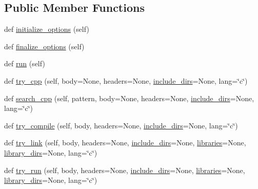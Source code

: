 \subsection*{Public Member Functions}
\begin{DoxyCompactItemize}
\item 
def \hyperlink{classsetuptools_1_1__distutils_1_1command_1_1config_1_1config_abb9677a5717da0170ef7b59fbf0de81c}{initialize\+\_\+options} (self)
\item 
def \hyperlink{classsetuptools_1_1__distutils_1_1command_1_1config_1_1config_a1b7c7fbb7934e5ac73bf41d03e1a105b}{finalize\+\_\+options} (self)
\item 
def \hyperlink{classsetuptools_1_1__distutils_1_1command_1_1config_1_1config_aa893e04cc412266537a91602b4874078}{run} (self)
\item 
def \hyperlink{classsetuptools_1_1__distutils_1_1command_1_1config_1_1config_ae4c3306eb838dd726030348758bddddb}{try\+\_\+cpp} (self, body=None, headers=None, \hyperlink{classsetuptools_1_1__distutils_1_1command_1_1config_1_1config_acb41ac5815aee2bd72a28028096a0564}{include\+\_\+dirs}=None, lang=\char`\"{}c\char`\"{})
\item 
def \hyperlink{classsetuptools_1_1__distutils_1_1command_1_1config_1_1config_a3dc84756b6a0f338703fe53ace1498db}{search\+\_\+cpp} (self, pattern, body=None, headers=None, \hyperlink{classsetuptools_1_1__distutils_1_1command_1_1config_1_1config_acb41ac5815aee2bd72a28028096a0564}{include\+\_\+dirs}=None, lang=\char`\"{}c\char`\"{})
\item 
def \hyperlink{classsetuptools_1_1__distutils_1_1command_1_1config_1_1config_af2bccea2d146f0d32149df4882eaabfb}{try\+\_\+compile} (self, body, headers=None, \hyperlink{classsetuptools_1_1__distutils_1_1command_1_1config_1_1config_acb41ac5815aee2bd72a28028096a0564}{include\+\_\+dirs}=None, lang=\char`\"{}c\char`\"{})
\item 
def \hyperlink{classsetuptools_1_1__distutils_1_1command_1_1config_1_1config_a47745cfa2a87b0d2061dbe7af7c66612}{try\+\_\+link} (self, body, headers=None, \hyperlink{classsetuptools_1_1__distutils_1_1command_1_1config_1_1config_acb41ac5815aee2bd72a28028096a0564}{include\+\_\+dirs}=None, \hyperlink{classsetuptools_1_1__distutils_1_1command_1_1config_1_1config_afa0c43069889b76e5d064528fdfe4e91}{libraries}=None, \hyperlink{classsetuptools_1_1__distutils_1_1command_1_1config_1_1config_a6d195b03e0f87fbdcf6666f874f4f5e1}{library\+\_\+dirs}=None, lang=\char`\"{}c\char`\"{})
\item 
def \hyperlink{classsetuptools_1_1__distutils_1_1command_1_1config_1_1config_ad8eceb51041d9033b882ccca73c34add}{try\+\_\+run} (self, body, headers=None, \hyperlink{classsetuptools_1_1__distutils_1_1command_1_1config_1_1config_acb41ac5815aee2bd72a28028096a0564}{include\+\_\+dirs}=None, \hyperlink{classsetuptools_1_1__distutils_1_1command_1_1config_1_1config_afa0c43069889b76e5d064528fdfe4e91}{libraries}=None, \hyperlink{classsetuptools_1_1__distutils_1_1command_1_1config_1_1config_a6d195b03e0f87fbdcf6666f874f4f5e1}{library\+\_\+dirs}=None, lang=\char`\"{}c\char`\"{})

\end{DoxyCompactItemize}
